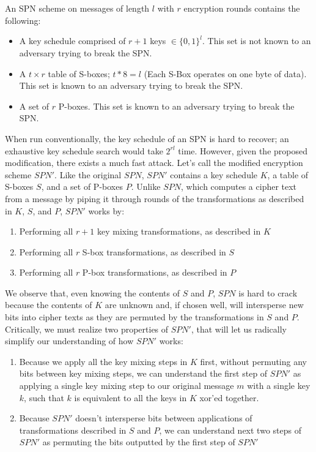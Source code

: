 \documentclass[]{article}
\begin{document}
\section{}
An SPN scheme on messages of length $l$ with $r$ encryption rounds contains the following:
\begin{itemize}
	\item A key schedule comprised of $r + 1$ keys $\in \{0,1\}^l$. This set is not known to an adversary trying to break the SPN.
	\item A $t \times r$ table of S-boxes; $t * 8 = l$ (Each S-Box operates on one byte of data). This set is known to an adversary trying to break the SPN.
	\item A set of $r$ P-boxes. This set is known to an adversary trying to break the SPN.
\end{itemize}
When run conventionally, the key schedule of an SPN is hard to recover; an exhaustive key schedule search would take $2^{rl}$ time. However, given the proposed modification, there exists a much fast attack. Let's call the modified encryption scheme $SPN'$. Like the original $SPN$, $SPN'$ contains a key schedule $K$, a table of S-boxes $S$, and a set of P-boxes $P$. Unlike $SPN$, which computes a cipher text from a message by piping it through rounds of the transformations as described in $K$, $S$, and $P$, $SPN'$ works by:
\begin{enumerate}
	\item Performing all $r + 1$ key mixing transformations, as described in $K$
	\item Performing all $r$ S-box transformations, as described in $S$
	\item Performing all $r$ P-box transformations, as described in $P$
\end{enumerate}
We observe that, even knowing the contents of $S$ and $P$, $SPN$ is hard to crack because the contents of $K$ are unknown and, if chosen well, will intersperse new bits into cipher texts as they are permuted by the transformations in $S$ and $P$. Critically, we must realize two properties of $SPN'$, that will let us radically simplify our understanding of how $SPN'$ works:
\begin{enumerate}
	\item Because we apply all the key mixing steps in $K$ first, without permuting any bits between key mixing steps, we can understand the first step of $SPN'$ as applying a single key mixing step to our original message $m$ with a single key $k$, such that $k$ is equivalent to all the keys in $K$ xor'ed together.
	\item Because $SPN'$ doesn't intersperse bits between applications of transformations described in $S$ and $P$, we can understand next two steps of $SPN'$ as permuting the bits outputted by the first step of $SPN'$
\end{enumerate}
\end{document}
